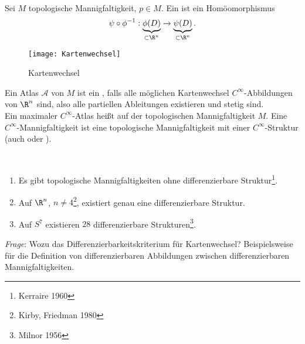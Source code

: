 \begin{definition}
  \  \\

  \begin{minipage}{.45\textwidth}
    Sei \( M \) topologische Mannigfaltigkeit, \( p \in M \). Ein \label{def:kartenwechsel} ist ein Homöomorphismus
    \begin{equation*}
      \psi \circ \phi^{-1}: \underbrace{\phi(D)}_{\subset \R^n} \to \underbrace{\psi(D)}_{\subset \R^n}\text{.}
    \end{equation*}
  \end{minipage}
  \hfill
  \begin{minipage}{.45\textwidth}
    \begin{figure}[H]
      \texttt{[image: Kartenwechsel]}
      \caption{Kartenwechsel}
    \end{figure}
  \end{minipage}
  Ein Atlas \( \mathcal{A} \) von \( M \) ist ein \label{def:dbatlas}, falls alle möglichen Kartenwechsel \( C^\infty \)-Abbildungen von \( \R^n \) sind, also alle partiellen Ableitungen existieren und stetig sind. \\
  Ein maximaler \( C^\infty \)-Atlas heißt \label{def:dbstruktur} auf der topologischen Mannigfaltigkeit \( M \). Eine \( C^\infty \)-Mannigfaltigkeit ist eine topologische Mannigfaltigkeit mit einer \( C^\infty \)-Struktur (auch \label{def:glattemannigfaltigkeit} oder \label{def:dbmannigfaltigkeit}).
\end{definition}

\begin{remark}
  \
  \begin{enumerate}
    \item Es gibt topologische Mannigfaltigkeiten ohne differenzierbare Struktur\footnote{Kerraire 1960}.
    \item Auf \( \R^n \), \( n \neq 4 \)\footnote{Kirby, Friedman 1980}, existiert genau eine differenzierbare Struktur.
    \item Auf \( S^7 \) existieren \( 28 \) differenzierbare Strukturen\footnote{Milnor 1956}.
  \end{enumerate}
  \emph{Frage}: Wozu das Differenzierbarkeitskriterium für Kartenwechsel? Beispielsweise für die Definition von differenzierbaren Abbildungen zwischen differenzierbaren Mannigfaltigkeiten.
\end{remark}


